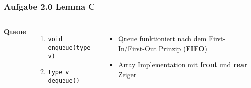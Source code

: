 \documentclass[aspectratio=169]{beamer}
\begin{document}
\begin{frame}
\frametitle{Aufgabe 2.0 Lemma C}
\begin{columns}[c] %
	
	\textbf{Queue}
	\begin{enumerate}
		\item \texttt{void enqueue(type v)}
		\item \texttt{type v dequeue()}
	\end{enumerate}
	
	\begin{itemize}
		\item Queue funktioniert nach dem First-In/First-Out Prinzip (\textbf{FIFO})
		\item Array Implementation mit \textbf{front} und \textbf{rear} Zeiger
	\end{itemize}
	
\end{columns}
\end{frame}
\end{document}
